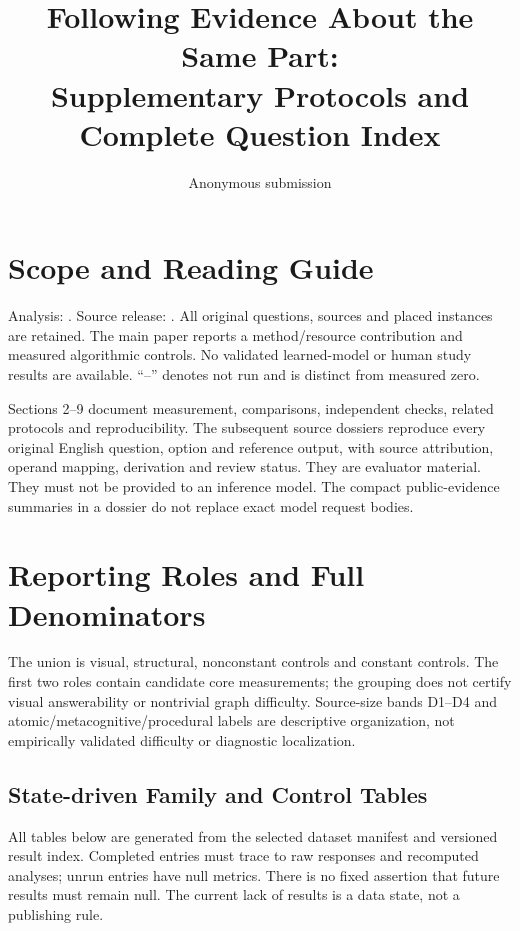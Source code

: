 \documentclass[10pt,letterpaper]{article}
\title{Following Evidence About the Same Part:\\
Supplementary Protocols and Complete Question Index}
\author{Anonymous submission}
\date{}
\begin{document}
\maketitle
\section{Scope and Reading Guide}
Analysis: .
Source release: .
All \EvTasks{} original questions, \EvSources{} sources and
\EvParts{} placed instances are retained. The main paper reports a
method/resource contribution and measured algorithmic controls.
No validated learned-model or human study results are available.
``--'' denotes not run and is distinct from measured zero.

Sections 2--9 document measurement, comparisons, independent checks,
related protocols and reproducibility. The subsequent source dossiers
reproduce every original English question, option and reference
output, with source attribution, operand mapping, derivation and
review status. They are evaluator material. They must not be provided
to an inference model. The compact public-evidence summaries in a
dossier do not replace exact model request bodies.

\section{Reporting Roles and Full Denominators}
\begin{table}[h]
\centering\small
\caption{The complete disjoint family partition. A source missing a
family is absent from its macro denominator, not assigned zero.}

\end{table}
The union is \EvVisual{} visual, \EvStructural{} structural,
\EvControls{} nonconstant controls and \EvConstant{} constant controls.
The first two roles contain candidate core measurements; the grouping
does not certify visual answerability or nontrivial graph difficulty.
Source-size bands D1--D4 and atomic/metacognitive/procedural labels
are descriptive organization, not empirically validated difficulty or
diagnostic localization.
\begin{center}\small\end{center}

\clearpage
\subsection{State-driven Family and Control Tables}
All tables below are generated from the selected dataset manifest and
versioned result index. Completed entries must trace to raw responses
and recomputed analyses; unrun entries have null metrics.
There is no fixed assertion that future results must remain null.
The current lack of results is a data state, not a publishing rule.
\end{document}
